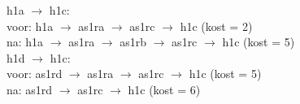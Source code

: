 h1a $\rightarrow$ h1c:\\
voor: h1a $\rightarrow$ as1ra $\rightarrow$ as1rc $\rightarrow$ h1c (kost = 2)\\
na: h1a $\rightarrow$ as1ra $\rightarrow$ as1rb $\rightarrow$ as1rc $\rightarrow$ h1c (kost = 5)\\

h1d $\rightarrow$ h1c:\\
voor: as1rd $\rightarrow$ as1ra $\rightarrow$ as1rc $\rightarrow$ h1c (kost = 5)\\
na: as1rd $\rightarrow$ as1rc $\rightarrow$ h1c (kost = 6)
